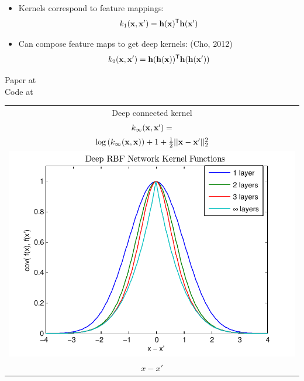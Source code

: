 \documentclass[portrait,a0b,final,a4resizeable]{include/a0poster}
\newcommand{\feat}{\vh}
\begin{document}
\begin{poster}
\begin{multicols}{2}
\begin{minipage}[c]{0.6\columnwidth}
\begin{itemize}
\item Kernels correspond to feature mappings:
$${k_1(\vx, \vx') = \feat(\vx) \tra \feat(\vx')}$$
\item Can compose feature maps to get deep kernels: {\color{mydarkblue} (Cho, 2012) }
$${k_2(\vx, \vx') = \feat(\feat(\vx)) \tra \feat(\feat(\vx'))}$$

\end{itemize}

Paper at {}\\
Code at {}


\end{minipage}
\begin{minipage}[c]{0.39\columnwidth}
\begin{centering}
\begin{tabular}{c}
Deep connected kernel \\
$k_\infty(\mathbf{x}, \mathbf{x}') = $ \\ $\log \left(k_\infty(\mathbf{x}, \mathbf{x}) \right) + 1 + \frac{1}{2} || \mathbf{x} - \mathbf{x}' ||_2^2$ \\[0.5cm]
\hspace{-0.5cm}\includegraphics[width=\columnwidth, clip, trim = 0cm 0.4cm 0.9cm 0.3cm]{../figures/deep_kernel_connected} \\
$x - x'$
\end{tabular}
\end{centering}
\end{minipage}

\end{multicols}
\end{poster}
\end{document}
